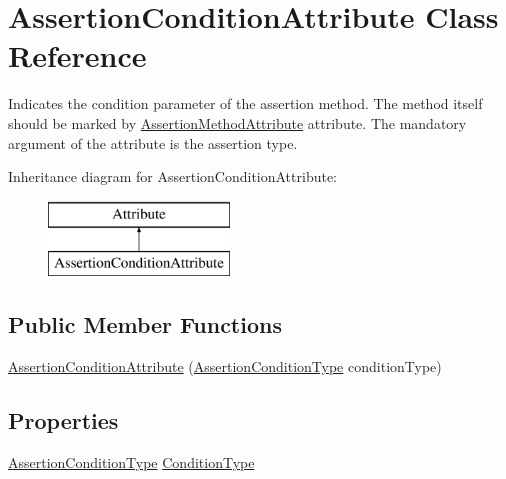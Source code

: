 \hypertarget{class_assertion_condition_attribute}{}\section{Assertion\+Condition\+Attribute Class Reference}
\label{class_assertion_condition_attribute}


Indicates the condition parameter of the assertion method. The method itself should be marked by \mbox{\hyperlink{class_assertion_method_attribute}{Assertion\+Method\+Attribute}} attribute. The mandatory argument of the attribute is the assertion type.  


Inheritance diagram for Assertion\+Condition\+Attribute\+:\begin{figure}[H]
\begin{center}
\leavevmode
\includegraphics[height=2.000000cm]{class_assertion_condition_attribute}
\end{center}
\end{figure}
\subsection*{Public Member Functions}
\begin{DoxyCompactItemize}
\item 
\mbox{\hyperlink{class_assertion_condition_attribute_a9e8e78b2fe91bb29f18154940860af32}{Assertion\+Condition\+Attribute}} (\mbox{\hyperlink{_annotations_8cs_a016c132b1d3a6c75524ade006560e87d}{Assertion\+Condition\+Type}} condition\+Type)
\end{DoxyCompactItemize}
\subsection*{Properties}
\begin{DoxyCompactItemize}
\item 
\mbox{\hyperlink{_annotations_8cs_a016c132b1d3a6c75524ade006560e87d}{Assertion\+Condition\+Type}} \mbox{\hyperlink{class_assertion_condition_attribute_ad07b5dd15df52a5c307ed41dda8299ef}{Condition\+Type}}
\end{DoxyCompactItemize}



